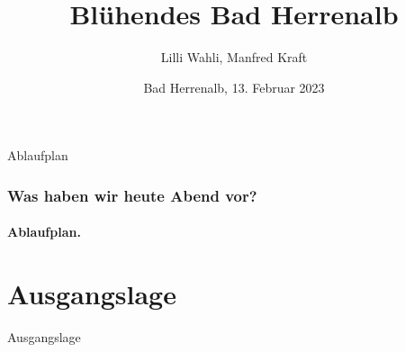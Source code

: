 \documentclass[aspectratio=169]{beamer}
\begin{document}

\author[Manfred]{Lilli Wahli, Manfred Kraft}
 
\title[Biodiversität]{\textbf{Blühendes Bad Herrenalb}}
\date{Bad Herrenalb, 13. Februar 2023}

\frame{\titlepage}



\begin{frame}{Ablaufplan}
\frametitle{{Was haben wir heute Abend vor?}} 
\framesubtitle{Ablaufplan.}
\tableofcontents[hideallsubsections]
\end{frame}                 


\section{Ausgangslage}

\begin{frame}{Ausgangslage}
\end{frame}

\end{document}
